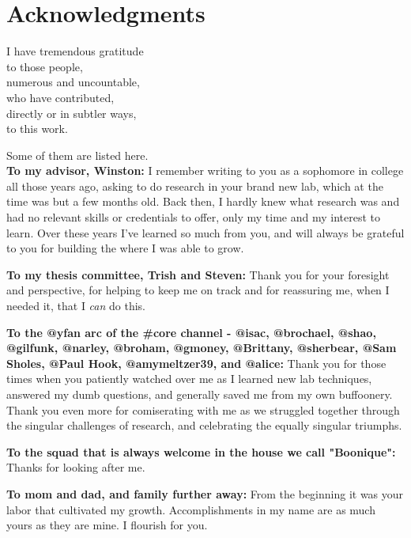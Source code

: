 \chapter*{Acknowledgments}

I have tremendous gratitude \\
to those people, \\
numerous and uncountable, \\
who have contributed, \\
directly or in subtler ways, \\
to this work.

Some of them are listed here. \\

\textbf{To my advisor, Winston:} I remember writing to you as a sophomore in college all those years ago, asking to do research in your brand new lab, which at the time was but a few months old. Back then, I hardly knew what research was and had no relevant skills or credentials to offer, only my time and my interest to learn. Over these years I've learned so much from you, and will always be grateful to you for building the where I was able to grow.

\textbf{To my thesis committee, Trish and Steven:} Thank you for your foresight and perspective, for helping to keep me on track and for reassuring me, when I needed it, that I \emph{can} do this.

\textbf{To the @yfan arc of the #core channel - @isac, @brochael, @shao, @gilfunk, @narley, @broham, @gmoney, @Brittany, @sherbear, @Sam Sholes, @Paul Hook, @amymeltzer39, and @alice:} Thank you for those times when you patiently watched over me as I learned new lab techniques, answered my dumb questions, and generally saved me from my own buffoonery. Thank you even more for comiserating with me as we struggled together through the singular challenges of research, and celebrating the equally singular triumphs.

\textbf{To the squad that is always welcome in the house we call "Boonique":} Thanks for looking after me.

\textbf{To mom and dad, and family further away:} From the beginning it was your labor that cultivated my growth. Accomplishments in my name are as much yours as they are mine. I flourish for you.
